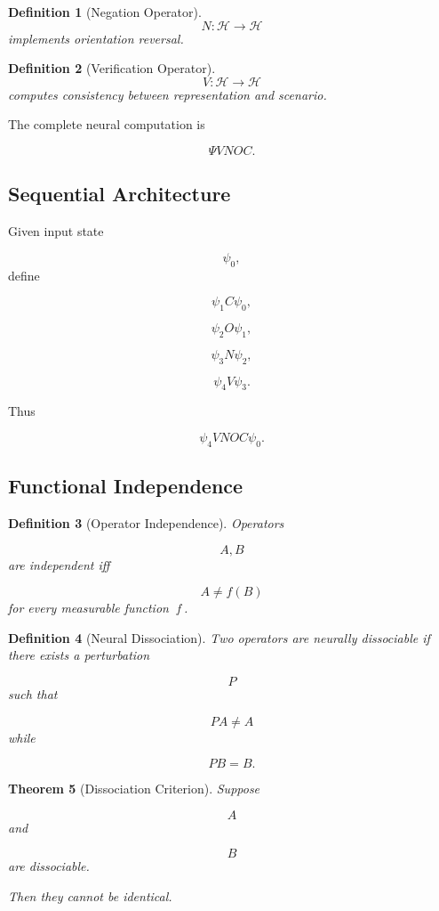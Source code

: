 \documentclass[12pt]{article}
\newtheorem{theorem}{Theorem}[section]
\newtheorem{definition}[theorem]{Definition}
\theoremstyle{remark}
\begin{document}
\begin{definition}[Negation Operator]
\[
N:\mathcal H\rightarrow\mathcal H
\]
implements orientation reversal.
\end{definition}

\begin{definition}[Verification Operator]
\[
V:\mathcal H\rightarrow\mathcal H
\]
computes consistency between representation and scenario.
\end{definition}

The complete neural computation is

\[
\Psi
VNOC.
\]

\subsection{Sequential Architecture}

Given input state

\[
\psi_0,
\]
define

\[
\psi_1
C\psi_0,
\]

\[
\psi_2
O\psi_1,
\]

\[
\psi_3
N\psi_2,
\]

\[
\psi_4
V\psi_3.
\]

Thus

\[
\psi_4
VNOC\psi_0.
\]

\subsection{Functional Independence}

\begin{definition}[Operator Independence]
Operators

\[
A,B
\]
are independent iff

\[
A\neq f(B)
\]
for every measurable function f.
\]
\end{definition}

\begin{definition}[Neural Dissociation]
Two operators are neurally dissociable if there exists a perturbation

\[
P
\]
such that

\[
PA\neq A
\]
while

\[
PB=B.
\]
\end{definition}
\begin{theorem}[Dissociation Criterion]
Suppose

\[
A
\]
and

\[
B
\]
are dissociable.

Then they cannot be identical.
\end{theorem}
\end{document}
